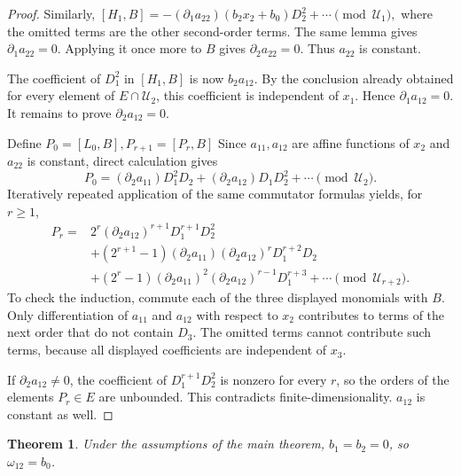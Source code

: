 \documentclass{tCON2e}
\newenvironment{revision}{\begingroup\color{black}}{\endgroup}
\numberwithin{equation}{section}
\theoremstyle{journalplain}
\newtheorem{theorem}{Theorem}[section]
\theoremstyle{journaldef}
\newenvironment{revision}{}{}
\begin{document}
\begin{revision}
\begin{proof}
Similarly,
\(
[H_1,B]
=-(\partial_1a_{22})(b_2x_2+b_0)D_2^2
 +\cdots\pmod{\mathcal U_1},
\)
where the omitted terms are the other second-order terms.
The same lemma gives $\partial_1a_{22}=0$.
Applying it once more to $B$ gives $\partial_2a_{22}=0$.
Thus $a_{22}$ is constant.

The coefficient of $D_1^2$ in $[H_1,B]$ is now $b_2a_{12}$.
By the conclusion already obtained for every element of
$E\cap\mathcal U_2$, this coefficient is independent of $x_1$.
Hence $\partial_1a_{12}=0$.
It remains to prove $\partial_2a_{12}=0$.

Define
\(
P_0=[L_0,B],P_{r+1}=[P_r,B]
\)
Since $a_{11},a_{12}$ are affine functions of $x_2$ and $a_{22}$
is constant, direct calculation gives
\[
P_0=(\partial_2a_{11})D_1^2D_2
    +(\partial_2a_{12})D_1D_2^2
    +\cdots\pmod{\mathcal U_2}.
\]
Iteratively repeated application of the same commutator formulas yields,
for $r\geq1$,
\[
\begin{aligned}
P_r
={}&2^r(\partial_2a_{12})^{r+1}D_1^{r+1}D_2^2\\
&+(2^{r+1}-1)(\partial_2a_{11})(\partial_2a_{12})^r
  D_1^{r+2}D_2\\
&+(2^r-1)(\partial_2a_{11})^2(\partial_2a_{12})^{r-1}
  D_1^{r+3}
 +\cdots\pmod{\mathcal U_{r+2}}.
\end{aligned}
\]
To check the induction, commute each of
the three displayed monomials with $B$. Only differentiation of
$a_{11}$ and $a_{12}$ with respect to $x_2$ contributes to terms
of the next order that do not contain $D_3$. The omitted terms
cannot contribute such terms, because all displayed coefficients
are independent of $x_3$.

If $\partial_2a_{12}\ne0$, the coefficient of
$D_1^{r+1}D_2^2$ is nonzero for every $r$, so the orders of the
elements $P_r\in E$ are unbounded. This contradicts
finite-dimensionality.
$a_{12}$ is constant as well.
\end{proof}

\begin{theorem}\label{thm:w12-constant}
Under the assumptions of the main theorem,
$b_1=b_2=0$, so $\omega_{12}=b_0$.
\end{theorem}


\end{revision}
\end{document}
